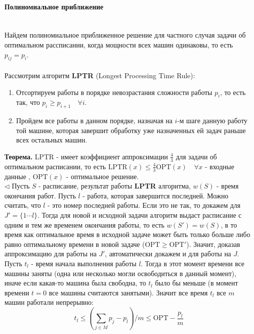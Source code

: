 \documentclass[10pt]{article}
\begin{document}
\paragraph{\Large{Полиномиальное приближение\\\\}}
\indent Найдем полиномиальное приближенное решение для частного случая задачи об оптимальном рассписании, когда мощности всех машин одинаковы, то есть $p_{ij} = p_i$. \\ \\ 
Рассмотрим алгоритм \textbf{LPTR} (Longest Processing Time Rule): \\
\begin{enumerate}
    \item Отсортируем работы в порядке невозрастания сложности работы $p_i$, то есть так, что $p_i \geq p_{i+1} \quad \forall i$. 
    \item Пройдем все работы в данном порядке, назначая на $i$-м шаге данную работу той машине, которая завершит обработку уже назначенных ей задач раньше всех остальных машин.
\end{enumerate}

\indent \textbf{Теорема.} LPTR - имеет коэффициент аппроксимации $\frac{4}{3}$ для задачи об оптимальном расписании, 
то есть $ \text{LPTR} (x) \leq \frac{4}{3} \text{OPT} (x) \quad \forall x$ - входные данные , $\text{OPT} (x)$ - оптимальное решение. \\
\indent $\triangleleft$ 
                Пусть $S$ - расписание, результат работы \textbf{LPTR} алгоритма, $w(S)$ - время окончания работ. Пусть $l$ - работа, которая завершится последней. Можно считать, что $l$ - это номер последней работы. Если это не так,
                то докажем для $J' = \{1 \cdots l\}$. Тогда для новой и исходной задачи алгоритм выдаст расписание с одним и тем же временем окончания работы, то есть $w(S') = w(S)$, в то время как оптимальное время в исходной задаче может быть только больше либо равно оптимальному времени в новой задаче ($\text{OPT} \geq \text{OPT}'$). Значит, доказав аппроксимацию для работы на $J'$, автоматически докажем и для работы на $J$. \\

                Пусть $t_l$ - время начала выполнения работы $l$. Тогда в этот момент времени все машины заняты (одна или несколько могли освободиться в данный момент), иначе если какая-то машина была свободна, то  $t_l$ было бы меньше (в момент времени $t = 0$ все машины считаются занятыми). Значит все время $t_l$ все $m$ машин работали непрерывно: 
                \begin{equation}
                    t_l \leq (\sum_{j \in M} p_j - p_l)/m \leq \text{OPT} - \frac{p_l}{m}
                \end{equation}
\end{document}
